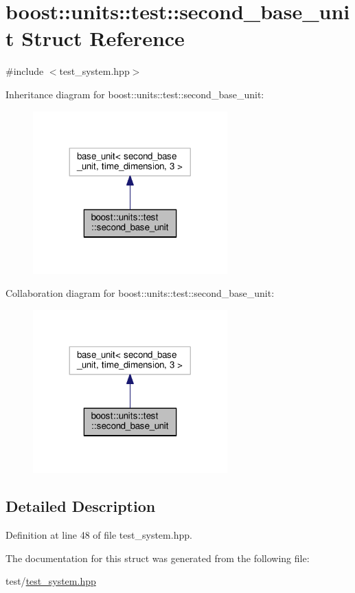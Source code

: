 \hypertarget{structboost_1_1units_1_1test_1_1second__base__unit}{}\section{boost\+:\+:units\+:\+:test\+:\+:second\+\_\+base\+\_\+unit Struct Reference}
\label{structboost_1_1units_1_1test_1_1second__base__unit}


{\ttfamily \#include $<$test\+\_\+system.\+hpp$>$}



Inheritance diagram for boost\+:\+:units\+:\+:test\+:\+:second\+\_\+base\+\_\+unit\+:\nopagebreak
\begin{figure}[H]
\begin{center}
\leavevmode
\includegraphics[width=212pt]{structboost_1_1units_1_1test_1_1second__base__unit__inherit__graph}
\end{center}
\end{figure}


Collaboration diagram for boost\+:\+:units\+:\+:test\+:\+:second\+\_\+base\+\_\+unit\+:\nopagebreak
\begin{figure}[H]
\begin{center}
\leavevmode
\includegraphics[width=212pt]{structboost_1_1units_1_1test_1_1second__base__unit__coll__graph}
\end{center}
\end{figure}


\subsection{Detailed Description}


Definition at line 48 of file test\+\_\+system.\+hpp.



The documentation for this struct was generated from the following file\+:\begin{DoxyCompactItemize}
\item 
test/\hyperlink{test__system_8hpp}{test\+\_\+system.\+hpp}\end{DoxyCompactItemize}
